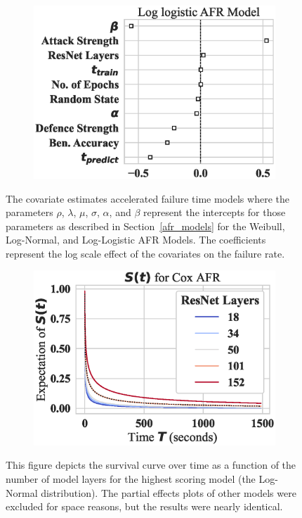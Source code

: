\begin{figure}
\begin{subfigure}[t]{0.3\textwidth}
        \includegraphics[width=\textwidth]{mnist_log_logistic_aft.eps}
    \end{subfigure}
    
    \caption{The covariate estimates accelerated failure time models where the parameters $\rho$, $\lambda$, $\mu$, $\sigma$, $\alpha$, and $\beta$ represent the intercepts for those parameters as described in Section~\ref{afr_models} for the Weibull, Log-Normal, and Log-Logistic AFR Models. The coefficients represent the log scale effect of the covariates on the failure rate.}
    \label{fig:mnist_afr_models}
\end{figure}

\begin{figure}
    \begin{subfigure}{}
        \centering\includegraphics[width=.5\textwidth]{mnist_log_normal_layers_partial_effect.eps}
        
        \label{fig:mnist_layers}
    \end{subfigure}
    \caption{This figure depicts the survival curve over time as a function of the number of model layers for the highest scoring model (the Log-Normal distribution). The partial effects plots of other models were excluded for space reasons, but the results were nearly identical.}
\end{figure}

